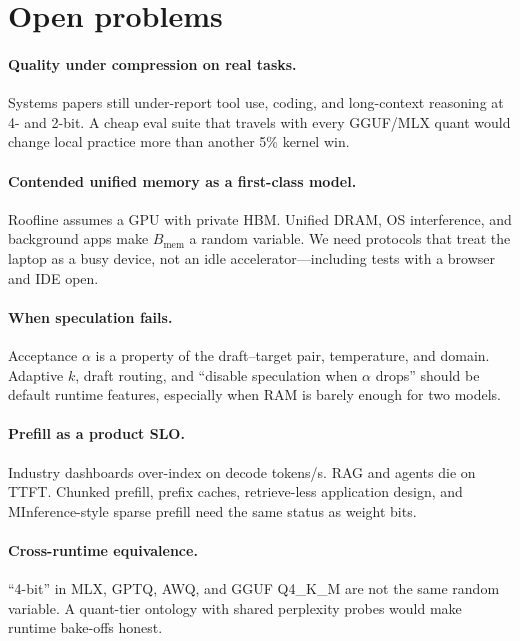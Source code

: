 \section{Open problems}
\label{sec:open}

\paragraph{Quality under compression on real tasks.}
Systems papers still under-report tool use, coding, and long-context reasoning at 4- and 2-bit. A cheap eval suite that travels with every GGUF/MLX quant would change local practice more than another 5\% kernel win.

\paragraph{Contended unified memory as a first-class model.}
Roofline assumes a GPU with private HBM. Unified DRAM, OS interference, and background apps make \(B_{\mathrm{mem}}\) a random variable. We need protocols that treat the laptop as a busy device, not an idle accelerator---including tests with a browser and IDE open.

\paragraph{When speculation fails.}
Acceptance \(\alpha\) is a property of the draft--target pair, temperature, and domain. Adaptive \(k\), draft routing, and ``disable speculation when \(\alpha\) drops'' should be default runtime features, especially when RAM is barely enough for two models.

\paragraph{Prefill as a product SLO.}
Industry dashboards over-index on decode tokens/s. RAG and agents die on TTFT. Chunked prefill, prefix caches, retrieve-less application design, and MInference-style sparse prefill need the same status as weight bits.

\paragraph{Cross-runtime equivalence.}
``4-bit'' in MLX, GPTQ, AWQ, and GGUF Q4\_K\_M are not the same random variable. A quant-tier ontology with shared perplexity probes would make runtime bake-offs honest.

